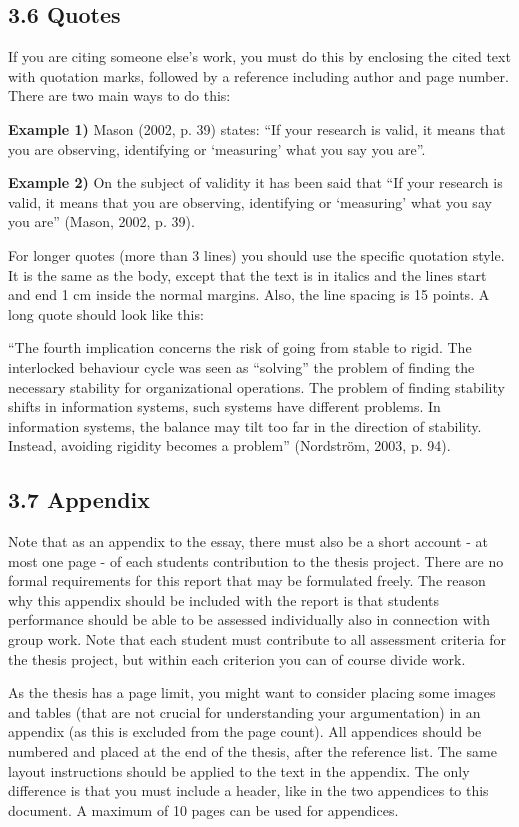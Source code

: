 \documentclass[]{article}
\begin{document}
\subsection{3.6 Quotes}

If you are citing someone else's work, you must do this by enclosing the
cited text with quotation marks, followed by a reference including
author and page number. There are two main ways to do this:

\textbf{Example 1)} Mason (2002, p. 39) states: ``If your research is
valid, it means that you are observing, identifying or `measuring' what
you say you are''.

\textbf{Example 2)} On the subject of validity it has been said that
``If your research is valid, it means that you are observing,
identifying or `measuring' what you say you are'' (Mason, 2002, p. 39).

For longer quotes (more than 3 lines) you should use the specific
quotation style. It is the same as the body, except that the text is in
italics and the lines start and end 1 cm inside the normal margins.
Also, the line spacing is 15 points. A long quote should look like this:

``The fourth implication concerns the risk of going from stable to
rigid. The interlocked behaviour cycle was seen as ``solving'' the
problem of finding the necessary stability for organizational
operations. The problem of finding stability shifts in information
systems, such systems have different problems. In information systems,
the balance may tilt too far in the direction of stability. Instead,
avoiding rigidity becomes a problem'' (Nordström, 2003, p. 94).

\subsection{3.7 Appendix}

Note that as an appendix to the essay, there must also be a short
account - at most one page - of each student\textquotesingle s
contribution to the thesis project. There are no formal requirements for
this report that may be formulated freely. The reason why this appendix
should be included with the report is that students\textquotesingle{}
performance should be able to be assessed individually also in
connection with group work. Note that each student must contribute to
all assessment criteria for the thesis project, but within each
criterion you can of course divide work.

As the thesis has a page limit, you might want to consider placing some
images and tables (that are not crucial for understanding your
argumentation) in an appendix (as this is excluded from the page count).
All appendices should be numbered and placed at the end of the thesis,
after the reference list. The same layout instructions should be applied
to the text in the appendix. The only difference is that you must
include a header, like in the two appendices to this document. A maximum
of 10 pages can be used for appendices.
\end{document}
